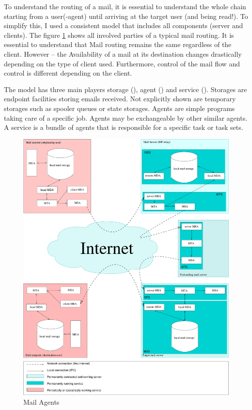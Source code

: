 To understand the routing of a mail, it is essential to understand the whole chain starting from a user(-agent) until arriving at the target user (and being read!). To simplify this, I used a consistent model that includes all components (server and clients). The figure \ref{fig:MailAgents} shows all involved parties of a typical mail routing. It is essential to understand that Mail routing remains the same regardless of the client. However -- the Availability of a mail at its destination changes drastically depending on the type of client used. Furthermore, control of the mail flow and control is different depending on the client.

The model has three main players storage (), agent () and service (). Storages are endpoint facilities storing emails received. Not explicitly shown are temporary storages such as spooler queues or state storages. Agents are simple programs taking care of a specific job. Agents may be exchangeable by other similar agents. A service is a bundle of agents that is responsible for a specific task or task sets.

\begin{figure}[ht!]
	\centering\includegraphics[width=\columnwidth]{inc/MailAgents1.pdf}
	\caption{Mail Agents}\label{fig:MailAgents}
\end{figure}

